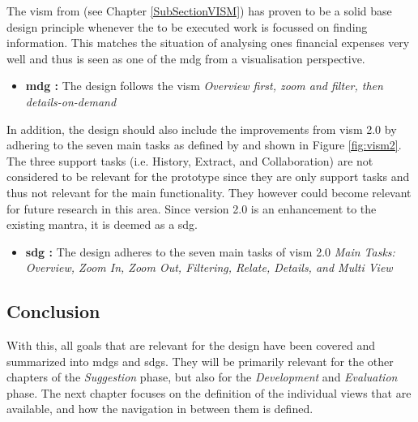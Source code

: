 The \gls{vism} from \cite{Shneiderman2005} (see Chapter \ref{SubSectionVISM}) has proven to be a solid base design principle whenever the to be executed work is focussed on finding information. This matches the situation of analysing ones financial expenses very well and thus is seen as one of the \gls{mdg} from a visualisation perspective.
\begin{itemize}[noitemsep,nolistsep]
	\item \textbf{\gls{mdg} :} The design follows the \gls{vism} \newline
		\textit{Overview first, zoom and filter, then details-on-demand}
\end{itemize}
In addition, the design should also include the improvements from \gls{vism} 2.0 by adhering to the seven main tasks as defined by \cite{Stauffer2016} and shown in Figure \ref{fig:vism2}. The three support tasks (i.e. History, Extract, and Collaboration) are not considered to be relevant for the prototype since they are only support tasks and thus not relevant for the main functionality. They however could become relevant for future research in this area. Since version 2.0 is an enhancement to the existing mantra, it is deemed as a \gls{sdg}.
\begin{itemize}[noitemsep,nolistsep]
	\item \textbf{\gls{sdg} :} The design adheres to the seven main tasks of \gls{vism} 2.0 \newline
		\textit{Main Tasks: Overview, Zoom In, Zoom Out, Filtering, Relate, Details, and Multi View}
\end{itemize}

\addtocounter{MainDesignGoalCounter}{-1}
\addtocounter{SubDesignGoalCounter}{-1}



\subsection{Conclusion}

With this, all goals that are relevant for the design have been covered and summarized into  \glspl{mdg} and  \glspl{sdg}. They will be primarily relevant for the other chapters of the \textit{Suggestion} phase, but also for the \textit{Development} and \textit{Evaluation} phase. \newline
The next chapter focuses on the definition of the individual views that are available, and how the navigation in between them is defined.


